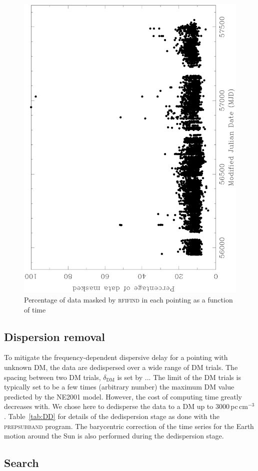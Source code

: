 \documentclass[a4paper,fleqn,usenatbib]{mnras}
\begin{document}
\begin{figure}
\includegraphics[height=\columnwidth,angle=-90]{plots/rfi.ps}
\caption{Percentage of data masked by \textsc{rfifind} in each pointing as a function of time}
\label{fig:rfi}
\end{figure}

\subsection{Dispersion removal}
To mitigate the frequency-dependent dispersive delay for a pointing
with unknown DM, the data are dedispersed over a wide range of DM
trials. The spacing between two DM trials, $\delta_{\text{DM}}$ is set
by ... The limit of the DM trials is typically set to be a few times
(arbitrary number) the maximum DM value predicted by the
\textsc{NE2001} model. However, the cost of computing time greatly decreases with.
We chose here to dedisperse the data to a DM up
to 3000\,pc\,cm$^{-3}$. Table~\ref{tab:DD} for details of the
dedispersion stage as done with the \textsc{prepsubband} program.  The barycentric correction of the time series for
the Earth motion around the Sun is also performed during the
dedispersion stage.



\subsection{Search}
\end{document}
